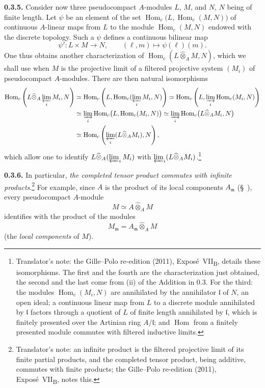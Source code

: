 
\medskip
\noindent\textbf{0.3.5.}
\label{sga3:VIIB:0.3.5}
Consider now three pseudocompact \(A\)-modules \(L\), \(M\), and \(N\),
\(N\) being of finite length. Let \(\psi\) be an element of the set
\(\operatorname{Hom}_c\bigl(L,\operatorname{Hom}_c(M,N)\bigr)\) of
continuous \(A\)-linear maps from \(L\) to the module
\(\operatorname{Hom}_c(M,N)\) endowed with the discrete topology. Such a
\(\psi\) defines a continuous bilinear map
\[
  \psi':L\times M\longrightarrow N,
  \qquad
  (\ell,m)\longmapsto\psi(\ell)(m).
\]
One thus obtains another characterization of
\(\operatorname{Hom}_c(L\widehat{\otimes}_A M,N)\), which we shall use
when \(M\) is the projective limit of a filtered projective system
\((M_i)\) of pseudocompact \(A\)-modules. There are then natural
isomorphisms
\begin{align*}
  \operatorname{Hom}_c
    \left(L\widehat{\otimes}_A\varprojlim_iM_i,N\right)
  &\simeq
  \operatorname{Hom}_c
    \left(L,\operatorname{Hom}_c(\varprojlim_iM_i,N)\right)
  \simeq
  \operatorname{Hom}_c
    \left(L,\varinjlim_i\operatorname{Hom}_c(M_i,N)\right)
  \\
  &\simeq
  \varinjlim_i
  \operatorname{Hom}_c
    \bigl(L,\operatorname{Hom}_c(M_i,N)\bigr)
  \simeq
  \varinjlim_i
  \operatorname{Hom}_c
    \bigl(L\widehat{\otimes}_A M_i,N\bigr)
  \\
  &\simeq
  \operatorname{Hom}_c
    \left(\varprojlim_i
      (L\widehat{\otimes}_A M_i),N\right),
\end{align*}
which allow one to identify \(L\widehat{\otimes}_A(\varprojlim_iM_i)\)
with \(\varprojlim_i(L\widehat{\otimes}_A M_i)\).\footnote{Translator's note: the Gille--Polo re-edition
(2011), Expos\'e~VII\textsubscript{B}, details these isomorphisms. The first and the fourth are the
characterization just obtained, the second and the last come from (ii) of the Addition in 0.3. For the
third: the modules \(\operatorname{Hom}_c(M_i,N)\) are annihilated by the annihilator \(\mathfrak l\) of
\(N\), an open ideal; a continuous linear map from \(L\) to a discrete module annihilated by
\(\mathfrak l\) factors through a quotient of \(L\) of finite length annihilated by \(\mathfrak l\), which
is finitely presented over the Artinian ring \(A/\mathfrak l\); and \(\operatorname{Hom}\) from a finitely
presented module commutes with filtered inductive limits.}

\medskip
\noindent\textbf{0.3.6.}
\label{sga3:VIIB:0.3.6}
In particular, \emph{the completed tensor product commutes with
infinite products}.\footnote{Translator's note: an infinite product is the filtered projective limit of
its finite partial products, and the completed tensor product, being additive, commutes with finite
products; the Gille--Polo re-edition (2011), Expos\'e~VII\textsubscript{B}, notes this.} For example,
since \(A\) is the product of its local components \(A_{\mathfrak m}\)
(\S~), every pseudocompact \(A\)-module
\[
  M\simeq A\widehat{\otimes}_A M
\]
identifies with the product of the modules
\[
  M_{\mathfrak m}
  =
  A_{\mathfrak m}\widehat{\otimes}_A M
\]
(the \emph{local components} of \(M\)).

